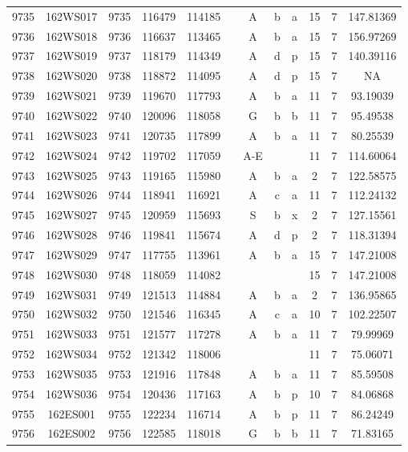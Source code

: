\begin{tabular}{|*{12}{c|}}
9735 & 162WS017 & 9735 & 116479 & 114185 &  & A & b & a & 15 & 7 & 147.81369 \\ 
9736 & 162WS018 & 9736 & 116637 & 113465 &  & A & b & a & 15 & 7 & 156.97269 \\ 
9737 & 162WS019 & 9737 & 118179 & 114349 &  & A & d & p & 15 & 7 & 140.39116 \\ 
9738 & 162WS020 & 9738 & 118872 & 114095 &  & A & d & p & 15 & 7 & NA \\ 
9739 & 162WS021 & 9739 & 119670 & 117793 &  & A & b & a & 11 & 7 & 93.19039 \\ 
9740 & 162WS022 & 9740 & 120096 & 118058 &  & G & b & b & 11 & 7 & 95.49538 \\ 
9741 & 162WS023 & 9741 & 120735 & 117899 &  & A & b & a & 11 & 7 & 80.25539 \\ 
9742 & 162WS024 & 9742 & 119702 & 117059 &  & A-E &  &  & 11 & 7 & 114.60064 \\ 
9743 & 162WS025 & 9743 & 119165 & 115980 &  & A & b & a & 2 & 7 & 122.58575 \\ 
9744 & 162WS026 & 9744 & 118941 & 116921 &  & A & c & a & 11 & 7 & 112.24132 \\ 
9745 & 162WS027 & 9745 & 120959 & 115693 &  & S & b & x & 2 & 7 & 127.15561 \\ 
9746 & 162WS028 & 9746 & 119841 & 115674 &  & A & d & p & 2 & 7 & 118.31394 \\ 
9747 & 162WS029 & 9747 & 117755 & 113961 &  & A & b & a & 15 & 7 & 147.21008 \\ 
9748 & 162WS030 & 9748 & 118059 & 114082 &  &  &  &  & 15 & 7 & 147.21008 \\ 
9749 & 162WS031 & 9749 & 121513 & 114884 &  & A & b & a & 2 & 7 & 136.95865 \\ 
9750 & 162WS032 & 9750 & 121546 & 116345 &  & A & c & a & 10 & 7 & 102.22507 \\ 
9751 & 162WS033 & 9751 & 121577 & 117278 &  & A & b & a & 11 & 7 & 79.99969 \\ 
9752 & 162WS034 & 9752 & 121342 & 118006 &  &  &  &  & 11 & 7 & 75.06071 \\ 
9753 & 162WS035 & 9753 & 121916 & 117848 &  & A & b & a & 11 & 7 & 85.59508 \\ 
9754 & 162WS036 & 9754 & 120436 & 117163 &  & A & b & p & 10 & 7 & 84.06868 \\ 
9755 & 162ES001 & 9755 & 122234 & 116714 &  & A & b & p & 11 & 7 & 86.24249 \\ 
9756 & 162ES002 & 9756 & 122585 & 118018 &  & G & b & b & 11 & 7 & 71.83165 \\ 

\end{tabular}
